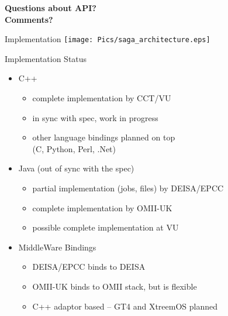\documentclass[%
  pdf,
  colorBG,
  slideColor,
  frames,
  ogf
]{prosper}
\newcommand{\B}[1]{\textbf{#1}}
\newcommand{\up}{\vspace*{-1em}}
\newcommand{\dn}{\vspace*{+1em}}
\begin{document}
 \begin{slide}{}
 
 \dn\dn\dn\dn\dn
 \begin{center}
  \Huge \B{Questions about API?}\\[10mm]
  \Huge \B{Comments?}\\[10mm]
 \end{center}
 
 \end{slide}
 

 \begin{slide}{Implementation}
   \texttt{[image: Pics/saga\_architecture.eps]}
 \end{slide}


 \begin{slide}{Implementation Status}

  \up

  \begin{itemize}

   \item C++
    \begin{itemize}
     \item complete implementation by CCT/VU
     \item in sync with spec, work in progress
     \item other language bindings planned on top\\
           (C, Python, Perl, .Net)
    \end{itemize}

   \item Java (out of sync with the spec)
    \begin{itemize}
     \item partial implementation (jobs, files) by DEISA/EPCC
     \item complete implementation by OMII-UK
     \item possible complete implementation at VU
    \end{itemize}

   \item MiddleWare Bindings
    \begin{itemize}
     \item DEISA/EPCC binds to DEISA
     \item OMII-UK binds to OMII stack, but is flexible
     \item C++ adaptor based -- GT4 and XtreemOS planned
    \end{itemize}

  \end{itemize}

 \end{slide}
\end{document}
